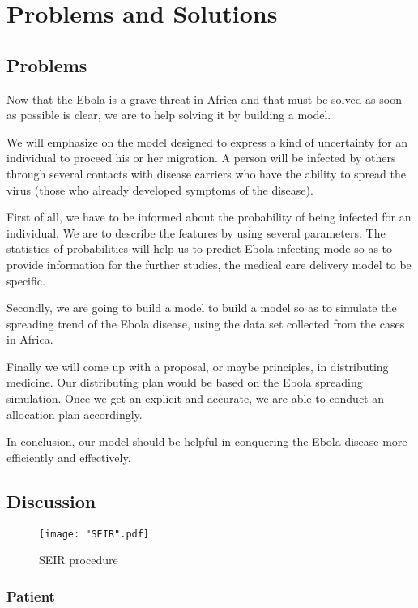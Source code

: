 \documentclass[12pt]{article}
\begin{document}
\section{Problems and Solutions}

\subsection{Problems}%

Now that the Ebola is a grave threat in Africa and that must be solved as soon as possible is clear, we are to help solving it by building a model.

We will emphasize on the model designed to express a kind of uncertainty for an individual to proceed his or her migration. A person will be infected by others through several contacts with disease carriers who have the ability to spread the virus (those who already developed symptoms of the disease).

First of all, we have to be informed about the probability of being infected for an individual. We are to describe the features by using several parameters. The statistics of probabilities will help us to predict Ebola infecting mode so as to provide information for the further studies, the medical care delivery model to be specific.

Secondly, we are going to build a model to build a model so as to simulate the spreading trend of the Ebola disease, using the data set collected from the cases in Africa.

Finally we will come up with a proposal, or maybe principles, in distributing medicine. Our distributing plan would be based on the Ebola spreading simulation. Once we get an explicit and accurate, we are able to conduct an allocation plan accordingly.

In conclusion, our model should be helpful in conquering the Ebola disease more efficiently and effectively.

\subsection{Discussion}%

\begin{figure}[t]
\centerline{\texttt{[image: "SEIR".pdf]}}
\caption{SEIR procedure}
\label{SEIR}
\end{figure}

\subsubsection{Patient}
\end{document}
